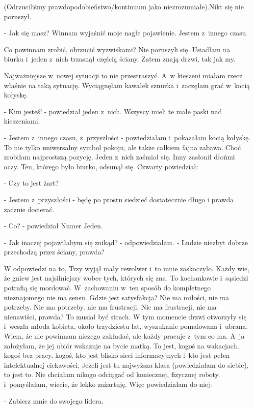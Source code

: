 \documentclass[oneside,polish,12pt,sfheadings]{mwbk}
\begin{document}
(Odrzuciliśmy prawdopodobieństwo/kontinuum jako niezrozumiałe).Nikt
się nie poruszył.

- Jak się masz? Winnam wyjaśnić moje nagłe pojawienie. Jestem z~innego
czasu.

Co powinnam zrobić, obrzucić wyzwiskami? Nie poruszyli się. Usiadłam
na biurku i~jeden z~nich trzasnął częścią ściany. Zatem znają drzwi,
tak jak my.

Najważniejsze w~nowej sytuacji to nie przestraszyć. A~w kieszeni miałam
rzecz właśnie na taką sytuację. Wyciągnęłam kawałek sznurka i~zaczęłam
grać w~kocią kołyskę.

- Kim jesteś! - powiedział jeden z~nich. Wszyscy mieli te małe paski
nad kieszeniami.

- Jestem z~innego czasu, z~przyszłości - powiedziałam i~pokazałam
kocią kołyskę. To nie tylko uniwersalny symbol pokoju, ale także całkiem
fajna zabawa. Choć zrobiłam najprostszą pozycję. Jeden z~nich zaśmiał
się. Inny zasłonił dłońmi oczy. Ten, którego było biurko, odsunął
się. Czwarty powiedział: 

- Czy to jest żart?

- Jestem z~przyszłości - będę po prostu siedzieć dostatecznie długo
i prawda zacznie docierać.

- Co? - powiedział Numer Jeden.

- Jak inaczej pojawiłabym się znikąd? - odpowiedziałam. - Ludzie niezbyt
dobrze przechodzą przez ściany, prawda?

W odpowiedzi na to, Trzy wyjął mały rewolwer i~to mnie zaskoczyło.
Każdy wie, że gniew jest najsilniejszy wobec tych, których się zna.
To kochankowie i~sąsiedzi potrafią się mordować. W~zachowaniu w~ten
sposób do kompletnego nieznajomego nie ma sensu. Gdzie jest satysfakcja?
Nie ma miłości, nie ma potrzeby. Nie ma potrzeby, nie ma frustracji.
Nie ma frustracji, nie ma nienawiści, prawda? To musiał być strach.
W tym momencie drzwi otworzyły się i~weszła młoda kobieta, około trzydziestu
lat, wyszukanie pomalowana i~ubrana. Wiem, że nie powinnam niczego
zakładać, ale każdy pracuje z~tym co ma. A~ja założyłam, że jej ubiór
wskazuje na bycie matką. To jest, kogoś na wakacjach, kogoś bez pracy,
kogoś, kto jest blisko sieci informacyjnych i~kto jest pełen intelektualnej
ciekawości. Jeżeli jest tu najwyższa klasa (powiedziałam do siebie),
to jest to. Nie chciałam nikogo odciągać od koniecznej, fizycznej
roboty. i~pomyślałam, wiecie, że lekko zażartuję. Więc powiedziałam
do niej: 

- Zabierz mnie do swojego lidera.
\end{document}
